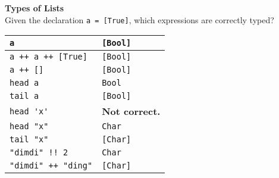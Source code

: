 \textbf{Types of Lists}\\
Given the declaration \lstinline|a = [True]|, which expressions are correctly typed?\\
\begin{tabularx}{\linewidth}{|X|X|}
  \hline
  \lstinline|a| & \lstinline|[Bool]|\\
  \hline
  \lstinline|a ++ a ++ [True]| & \lstinline|[Bool]|\\
  \hline
  \lstinline|a ++ []| & \lstinline|[Bool]|\\
  \hline
  \lstinline|head a| & \lstinline|Bool|\\
  \hline
  \lstinline|tail a| & \lstinline|[Bool]|\\
  \hline
  \lstinline|head 'x'| & \textbf{Not correct.}\\
  \hline
  \lstinline|head "x"| & \lstinline|Char|\\
  \hline
  \lstinline|tail "x"| & \lstinline|[Char]|\\
  \hline
  \lstinline|"dimdi" !! 2| & \lstinline|Char|\\
  \hline
  \lstinline|"dimdi" ++ "ding"| & \lstinline|[Char]|\\
  \hline
\end{tabularx}

